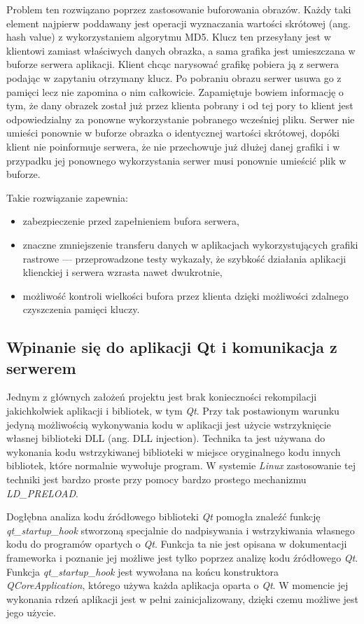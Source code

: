 Problem ten rozwiązano poprzez zastosowanie buforowania obrazów. Każdy taki element najpierw poddawany jest operacji wyznaczania wartości skrótowej (ang. hash value) z wykorzystaniem algorytmu MD5. Klucz ten przesyłany jest w klientowi zamiast właściwych danych obrazka, a sama grafika jest umieszczana w buforze serwera aplikacji. Klient chcąc narysować grafikę pobiera ją z serwera podając w zapytaniu otrzymany klucz. Po pobraniu obrazu serwer usuwa go z pamięci lecz nie zapomina o nim całkowicie. Zapamiętuje bowiem informację o tym, że dany obrazek został już przez klienta pobrany i od tej pory to klient jest odpowiedzialny za ponowne wykorzystanie pobranego wcześniej pliku. Serwer nie umieści ponownie w buforze obrazka o identycznej wartości skrótowej, dopóki klient nie poinformuje serwera, że nie przechowuje już dłużej danej grafiki i w przypadku jej ponownego wykorzystania serwer musi ponownie umieścić plik w buforze. 

Takie rozwiązanie zapewnia:
\begin{itemize}
\item zabezpieczenie przed zapełnieniem bufora serwera,
\item znaczne zmniejszenie transferu danych w aplikacjach wykorzystujących grafiki rastrowe --- przeprowadzone testy wykazały, że szybkość działania aplikacji klienckiej i serwera wzrasta nawet dwukrotnie,
\item możliwość kontroli wielkości bufora przez klienta dzięki możliwości zdalnego czyszczenia pamięci kluczy.
\end{itemize}

\subsection{Wpinanie się do aplikacji Qt i komunikacja z serwerem}
Jednym z głównych założeń projektu jest brak konieczności rekompilacji jakichkolwiek aplikacji i bibliotek, w tym \emph{Qt}. Przy tak postawionym warunku jedyną możliwością wykonywania kodu w aplikacji jest użycie wstrzyknięcie własnej biblioteki DLL (ang. DLL injection). Technika ta jest używana do wykonania kodu wstrzykiwanej biblioteki w miejsce oryginalnego kodu innych bibliotek, które normalnie wywołuje program. W systemie \emph{Linux} zastosowanie tej techniki jest bardzo proste przy pomocy bardzo prostego mechanizmu \emph{LD\_PRELOAD}\cite{ld}.

Dogłębna analiza kodu źródłowego biblioteki \emph{Qt} pomogła znaleźć funkcję \emph{qt\_startup\_hook} stworzoną specjalnie do nadpisywania i  wstrzykiwania własnego kodu do programów opartych o \emph{Qt}.
Funkcja ta nie jest opisana w dokumentacji frameworka i poznanie jej możliwe jest tylko poprzez analizę kodu źródłowego \emph{Qt}. Funkcja \emph{qt\_startup\_hook} jest wywołana na końcu konstruktora \emph{QCoreApplication}, którego używa każda aplikacja oparta o \emph{Qt}. W momencie jej wykonania rdzeń aplikacji jest w pełni zainicjalizowany, dzięki czemu możliwe jest jego użycie.

